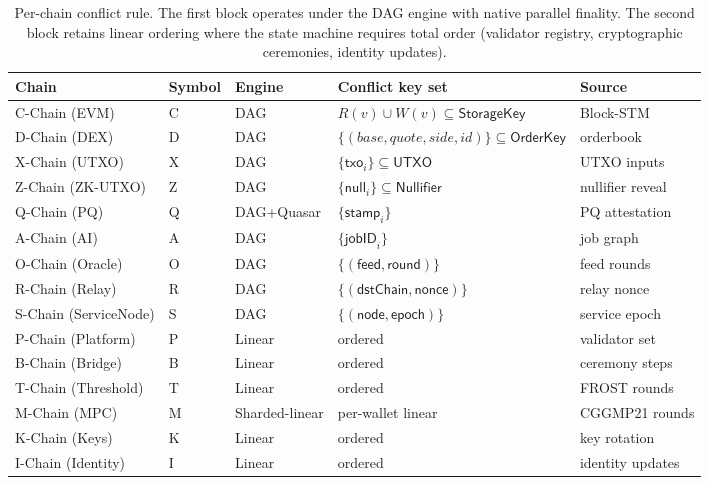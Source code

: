\documentclass[11pt]{article}
\theoremstyle{definition}
\begin{document}
\begin{table}[h]
\centering
\small
\begin{tabular}{lllll}
\toprule
\textbf{Chain} & \textbf{Symbol} & \textbf{Engine} & \textbf{Conflict key set} & \textbf{Source} \\
\midrule
C-Chain (EVM)         & C & DAG  & $R(v) \cup W(v) \subseteq \mathsf{StorageKey}$ & Block-STM \\
D-Chain (DEX)         & D & DAG  & $\{(base,quote,side,id)\} \subseteq \mathsf{OrderKey}$ & orderbook \\
X-Chain (UTXO)        & X & DAG  & $\{\mathsf{txo}_i\} \subseteq \mathsf{UTXO}$ & UTXO inputs \\
Z-Chain (ZK-UTXO)     & Z & DAG  & $\{\mathsf{null}_i\} \subseteq \mathsf{Nullifier}$ & nullifier reveal \\
Q-Chain (PQ)          & Q & DAG+Quasar & $\{\mathsf{stamp}_i\}$ & PQ attestation \\
A-Chain (AI)          & A & DAG  & $\{\mathsf{jobID}_i\}$ & job graph \\
O-Chain (Oracle)      & O & DAG  & $\{(\mathsf{feed},\mathsf{round})\}$ & feed rounds \\
R-Chain (Relay)       & R & DAG  & $\{(\mathsf{dstChain},\mathsf{nonce})\}$ & relay nonce \\
S-Chain (ServiceNode) & S & DAG  & $\{(\mathsf{node},\mathsf{epoch})\}$ & service epoch \\
\midrule
P-Chain (Platform)    & P & Linear & ordered         & validator set \\
B-Chain (Bridge)      & B & Linear & ordered         & ceremony steps \\
T-Chain (Threshold)   & T & Linear & ordered         & FROST rounds \\
M-Chain (MPC)         & M & Sharded-linear & per-wallet linear & CGGMP21 rounds \\
K-Chain (Keys)        & K & Linear & ordered         & key rotation \\
I-Chain (Identity)    & I & Linear & ordered         & identity updates \\
\bottomrule
\end{tabular}
\caption{Per-chain conflict rule. The first block operates under the DAG
engine with native parallel finality. The second block retains linear
ordering where the state machine requires total order (validator registry,
cryptographic ceremonies, identity updates).}
\label{tab:conflict}
\end{table}
\end{document}
